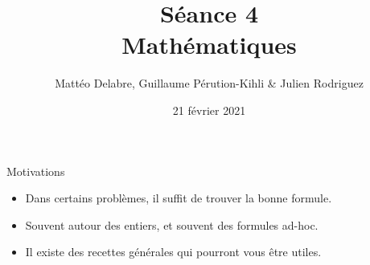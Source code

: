 \documentclass{main}
\title{\textbf{Séance 4}\\Mathématiques}
\institute{Université de Montpellier}
\author{Mattéo Delabre, Guillaume Pérution-Kihli \& Julien Rodriguez}
\date{21 février 2021}
\begin{document}

\maketitle

\begin{frame}{Motivations}
    \begin{itemize}
        \item Dans certains problèmes, il suffit de trouver la bonne formule.
        \item Souvent autour des entiers, et souvent des formules ad-hoc.
        \item Il existe des recettes générales qui pourront vous être utiles.
    \end{itemize}
\end{frame}
\end{document}
